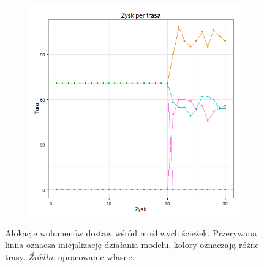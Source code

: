 \documentclass[polish, twoside, 12pt, a4paper]{article}
\theoremstyle{definition}
\theoremstyle{plain}
\theoremstyle{remark}
\begin{document}
\begin{figure}[hbt]
  \centering

  \begin{subfigure}[t]{0.8\textwidth}
    \includegraphics[width=\textwidth]{pictures/trasy.png}
  \end{subfigure}

  \captionsetup{margin=10pt,font=small,labelfont=bf,width=.8\textwidth}

  \caption[Alokacje wolumenów dostaw wśród możliwych ścieżek]{Alokacje wolumenów dostaw wśród możliwych ścieżek. Przerywana liniia oznacza inicjalizację działania modelu, kolory oznaczają różne trasy. \textit{Źródło:} opracowanie własne.}\label{fig:sciezki}
\end{figure}
\end{document}
